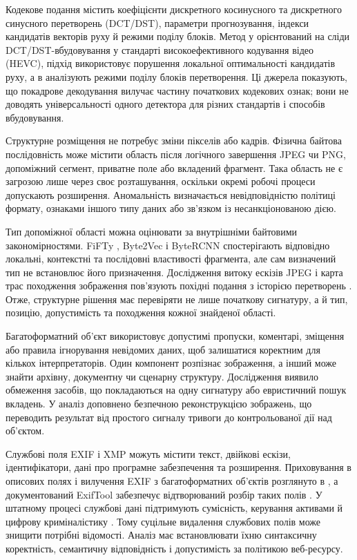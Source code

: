 Кодекове подання містить коефіцієнти дискретного косинусного та дискретного синусного перетворень (DCT/DST), параметри прогнозування, індекси кандидатів векторів руху й режими поділу блоків. Метод у \cite{zhang2022cnnhevc} орієнтований на сліди DCT/DST-вбудовування у стандарті високоефективного кодування відео (HEVC), підхід \cite{liu2021hevclocaloptimality} використовує порушення локальної оптимальності кандидатів руху, а в \cite{cao2026hevcpartition} аналізують режими поділу блоків перетворення. Ці джерела показують, що покадрове декодування вилучає частину початкових кодекових ознак; вони не доводять універсальності одного детектора для різних стандартів і способів вбудовування.

Структурне розміщення не потребує зміни пікселів або кадрів. Фізична байтова послідовність може містити область після логічного завершення JPEG чи PNG, допоміжний сегмент, приватне поле або вкладений фрагмент. Така область не є загрозою лише через своє розташування, оскільки окремі робочі процеси допускають розширення. Аномальність визначається невідповідністю політиці формату, ознаками іншого типу даних або зв’язком із несанкціонованою дією.

Тип допоміжної області можна оцінювати за внутрішніми байтовими закономірностями. FiFTy \cite{mittal2021fifty}, Byte2Vec \cite{haque2022byteembeddings} і ByteRCNN \cite{skracic2023bytercnn} спостерігають відповідно локальні, контекстні та послідовні властивості фрагмента, але сам визначений тип не встановлює його призначення. Дослідження витоку ескізів JPEG і карта трас походження зображення пов’язують похідні подання з історією перетворень \cite{benes2023thumbnails,kiltz2024trace}. Отже, структурне рішення має перевіряти не лише початкову сигнатуру, а й тип, позицію, допустимість та походження кожної знайденої області.

Багатоформатний об’єкт використовує допустимі пропуски, коментарі, зміщення або правила ігнорування невідомих даних, щоб залишатися коректним для кількох інтерпретаторів. Один компонент розпізнає зображення, а інший може знайти архівну, документну чи сценарну структуру. Дослідження \cite{koch2022polyglot} виявило обмеження засобів, що покладаються на одну сигнатуру або евристичний пошук вкладень. У \cite{koch2025polyglot} аналіз доповнено безпечною реконструкцією зображень, що переводить результат від простого сигналу тривоги до контрольованої дії над об’єктом.

Службові поля EXIF і XMP можуть містити текст, двійкові ескізи, ідентифікатори, дані про програмне забезпечення та розширення. Приховування в описових полях і вилучення EXIF з багатоформатних об’єктів розглянуто в \cite{fernando2024metadata,kalaimagal2024exif}, а документований ExifTool забезпечує відтворюваний розбір таких полів \cite{exiftool2026}. У штатному процесі службові дані підтримують сумісність, керування активами й цифрову криміналістику \cite{easttom2024windows}. Тому суцільне видалення службових полів може знищити потрібні відомості. Аналіз має встановлювати їхню синтаксичну коректність, семантичну відповідність і допустимість за політикою веб-ресурсу.

